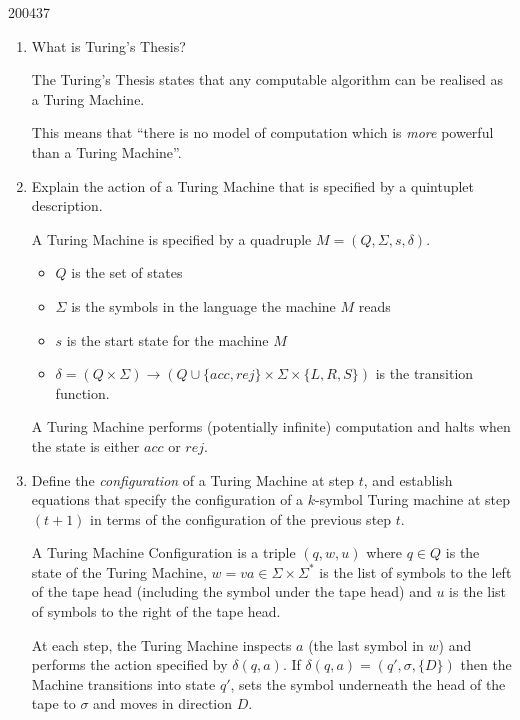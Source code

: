 \documentclass[10pt,\jkfside,a4paper]{article}
\begin{document}
\begin{examquestion}{2004}{3}{7}

\begin{enumerate}

\item What is Turing's Thesis?

The Turing's Thesis states that any computable algorithm can be realised as
a Turing Machine.

This means that ``there is no model of computation which is \textit{more}
powerful than a Turing Machine''.

\item Explain the action of a Turing Machine that is specified by a
quintuplet description.

A Turing Machine is specified by a quadruple $M = (Q, \Sigma, s, \delta)$.

\begin{itemize}

\item $Q$ is the set of states

\item $\Sigma$ is the symbols in the language the machine $M$ reads

\item $s$ is the start state for the machine $M$

\item $\delta = (Q \times \Sigma) \to (Q \cup \{acc, rej\} \times \Sigma
 \times \{L, R, S\})$ is the transition function.

\end{itemize}

A Turing Machine performs (potentially infinite) computation and halts when
the state is either $acc$ or $rej$.

\item Define the \textit{configuration} of a Turing Machine at step $t$, and
establish equations that specify the configuration of a $k$-symbol Turing
machine at step $(t + 1)$ in terms of the configuration of the previous step
$t$.

A Turing Machine Configuration is a triple $(q, w, u)$ where $q \in Q$ is
the state of the Turing Machine, $w = va \in \Sigma \times \Sigma^*$ is the
list of symbols to the left of the tape head (including the symbol under the
tape head) and $u$ is the list of symbols to the right of the tape head.

At each step, the Turing Machine inspects $a$ (the last symbol in $w$) and
performs the action specified by $\delta(q, a)$. If $\delta(q, a) = (q',
\sigma, \{D\})$ then the Machine transitions into state $q'$, sets the
symbol underneath the head of the tape to $\sigma$ and moves in direction $D$.


\end{enumerate}
\end{examquestion}
\end{document}
